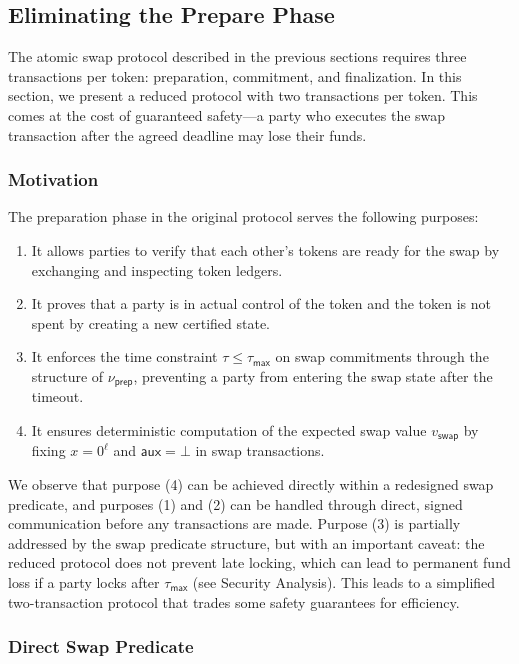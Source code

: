 \documentclass{article}
\newcommand{\auxd}[0]{\mathsf{aux}}
\begin{document}
\subsection{Eliminating the Prepare Phase}

The atomic swap protocol described in the previous sections requires three transactions per token: preparation, commitment, and finalization. In this section, we present a reduced protocol with two transactions per token. This comes at the cost of guaranteed safety---a party who executes the swap transaction after the agreed deadline may lose their funds.

\subsubsection{Motivation}

The preparation phase in the original protocol serves the following purposes:
\begin{enumerate}
\item It allows parties to verify that each other's tokens are ready for the swap by exchanging and inspecting token ledgers.
\item It proves that a party is in actual control of the token and the token is not spent by creating a new certified state.
\item It enforces the time constraint $\tau \le \tau_\mathsf{max}$ on swap commitments through the structure of $\nu_\mathsf{prep}$, preventing a party from entering the swap state after the timeout.
\item It ensures deterministic computation of the expected swap value $v_\mathsf{swap}$ by fixing $x = 0^\ell$ and $\auxd = \bot$ in swap transactions.
\end{enumerate}
We observe that purpose (4) can be achieved directly within a redesigned swap predicate, and purposes (1) and (2) can be handled through direct, signed communication before any transactions are made. Purpose (3) is partially addressed by the swap predicate structure, but with an important caveat: the reduced protocol does not prevent late locking, which can lead to permanent fund loss if a party locks after $\tau_\mathsf{max}$ (see Security Analysis). This leads to a simplified two-transaction protocol that trades some safety guarantees for efficiency.

\subsubsection{Direct Swap Predicate}
\end{document}
